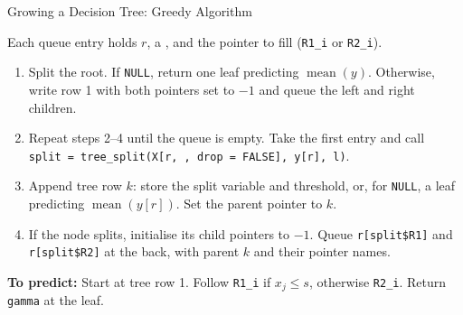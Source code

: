 \documentclass[10pt]{beamer}
\begin{document}


\begin{frame}{Growing a Decision Tree: Greedy Algorithm}
\small
\setlength{\parskip}{1mm}

Each queue entry holds  $r$, a , and the pointer to fill (\texttt{R1\_i} or \texttt{R2\_i}).

\begin{enumerate}
\setlength{\itemsep}{0pt}
\item Split the root. If \texttt{NULL}, return one leaf predicting $\operatorname{mean}(y)$.
Otherwise, write row 1 with both pointers set to $-1$ and queue the left and right children.
\item Repeat steps 2--4 until the queue is empty. Take the first entry and call\\
\texttt{split = tree\_split(X[r, , drop = FALSE], y[r], l)}.
\item Append tree row $k$: store the split variable and threshold, or, for \texttt{NULL}, a leaf predicting $\operatorname{mean}(y[r])$. Set the parent pointer to $k$.
\item If the node splits, initialise its child pointers to $-1$. Queue \texttt{r[split\$R1]} and \texttt{r[split\$R2]} at the back, with parent $k$ and their pointer names.
\end{enumerate}

\textbf{To predict:} Start at tree row 1. Follow \texttt{R1\_i} if $x_j\leq s$, otherwise \texttt{R2\_i}. Return \texttt{gamma} at the leaf.
\end{frame}
\end{document}
